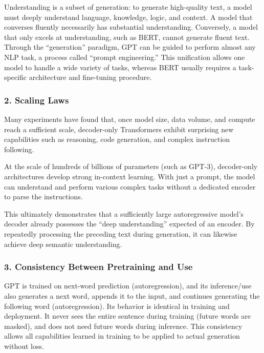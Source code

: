 Understanding is a subset of generation: to generate high-quality text, a model must deeply understand language, knowledge, logic, and context. A model that converses fluently necessarily has substantial understanding. Conversely, a model that only excels at understanding, such as BERT, cannot generate fluent text. Through the ``generation'' paradigm, GPT can be guided to perform almost any NLP task, a process called ``prompt engineering.'' This unification allows one model to handle a wide variety of tasks, whereas BERT usually requires a task-specific architecture and fine-tuning procedure.

\hypertarget{scaling-laws}{%
\subsubsection{2. Scaling Laws}\label{scaling-laws}}

Many experiments have found that, once model size, data volume, and compute reach a sufficient scale, decoder-only Transformers exhibit surprising new capabilities such as reasoning, code generation, and complex instruction following.

At the scale of hundreds of billions of parameters (such as GPT-3), decoder-only architectures develop strong in-context learning. With just a prompt, the model can understand and perform various complex tasks without a dedicated encoder to parse the instructions.

This ultimately demonstrates that a sufficiently large autoregressive model's decoder already possesses the ``deep understanding'' expected of an encoder. By repeatedly processing the preceding text during generation, it can likewise achieve deep semantic understanding.

\hypertarget{consistency-between-pretraining-and-use}{%
\subsubsection{3. Consistency Between Pretraining and Use}\label{consistency-between-pretraining-and-use}}

GPT is trained on next-word prediction (autoregression), and its inference/use also generates a next word, appends it to the input, and continues generating the following word (autoregression). Its behavior is identical in training and deployment. It never sees the entire sentence during training (future words are masked), and does not need future words during inference. This consistency allows all capabilities learned in training to be applied to actual generation without loss.

